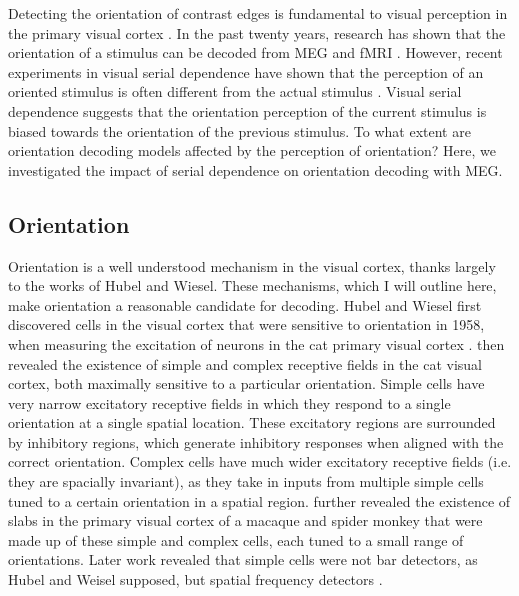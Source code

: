\documentclass[../main.tex]{subfiles}
\begin{document}
Detecting the orientation of contrast edges is fundamental to visual perception in the primary visual cortex \citep{hubel_wiesel_1959, hubel_wiesel_1968}. In the past twenty years, research has shown that the orientation of a stimulus can be decoded from MEG and fMRI \citep{mannion_mcdonald_clifford_2009, cichy_ramirez_pantazis_2015}. However, recent experiments in visual serial dependence have shown that the perception of an oriented stimulus is often different from the actual stimulus \citep{fischer_whitney_2014}. Visual serial dependence suggests that the orientation perception of the current stimulus is biased towards the orientation of the previous stimulus. To what extent are orientation decoding models affected by the perception of orientation? Here, we investigated the impact of serial dependence on orientation decoding with MEG.

\subsection{Orientation}
Orientation is a well understood mechanism in the visual cortex, thanks largely to the works of Hubel and Wiesel. These mechanisms, which I will outline here, make orientation a reasonable candidate for decoding. Hubel and Wiesel first discovered cells in the visual cortex that were sensitive to orientation in 1958, when measuring the excitation of neurons in the cat primary visual cortex \citep{hubel_wiesel_1959}. \cite{hubel_wiesel_1962} then revealed the existence of simple and complex receptive fields in the cat visual cortex, both maximally sensitive to a particular orientation. Simple cells have very narrow excitatory receptive fields in which they respond to a single orientation at a single spatial location. These excitatory regions are surrounded by inhibitory regions, which generate inhibitory responses when aligned with the correct orientation. Complex cells have much wider excitatory receptive fields (i.e. they are spacially invariant), as they take in inputs from multiple simple cells tuned to a certain orientation in a spatial region. \cite{hubel_wiesel_1968} further revealed the existence of slabs in the primary visual cortex of a macaque and spider monkey that were made up of these simple and complex cells, each tuned to a small range of orientations. Later work revealed that simple cells were not bar detectors, as Hubel and Weisel supposed, but spatial frequency detectors \citep{DEVALOIS1982545, devalois_1978}. 
\end{document}
